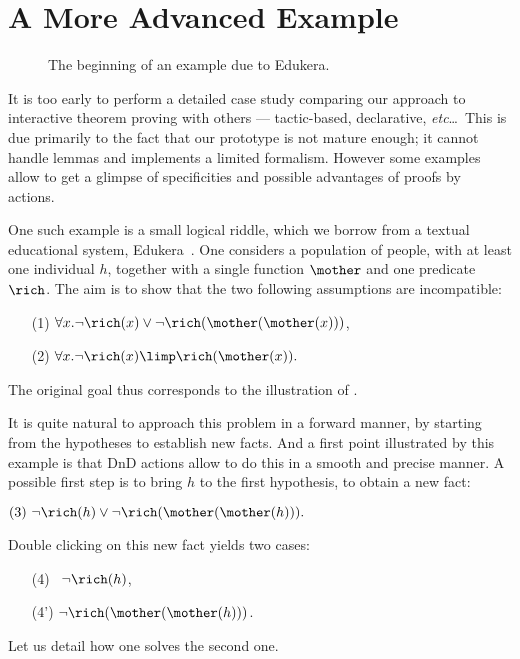 \section{A More Advanced Example}
\begin{figure*}
\caption{The beginning of an example due to Edukera.}
\end{figure*}

It is too early to perform a detailed case study comparing our approach
to interactive theorem proving with others --- tactic-based,
declarative, {\em etc}\dots~This is due primarily to the fact that
our prototype is not mature enough; it cannot handle lemmas and
implements a limited formalism. However some examples allow to get a
glimpse of specificities and possible advantages of proofs by actions.

One such example is a small logical riddle, which we borrow from a
textual educational system, Edukera~\cite{edukera}. One considers a
population of people, with at least one individual $h$, together with a
single function $\mother$ and one predicate $\rich$. The aim is to
show that the two following assumptions are incompatible:
\begin{itemize}
\item[(1)] $\forall x. \neg\rich(x)\lor \neg\rich(\mother(\mother(x)))$,
\item[(2)] $\forall x. \neg\rich(x) \limp \rich(\mother(x)).$
\end{itemize}
The original goal thus corresponds to the illustration of .

It is quite natural to approach this problem in a forward manner, by starting
from the hypotheses to establish new facts. And a first point illustrated by
this example is that DnD actions allow to do this in a smooth and precise
manner. A possible first step is to bring $h$ to the first hypothesis, to obtain
a new fact:

\medskip
$(3) ~\neg\rich(h)\lor \neg\rich(\mother(\mother(h))).$
\medskip

\noindent Double clicking on this new fact yields two cases:
\begin{itemize}
 \item[(4)~] $ \neg\rich(h)$,
 \item[(4')] $ \neg\rich(\mother(\mother(h)))$.
 \end{itemize}
Let us detail how one solves the
second one.

